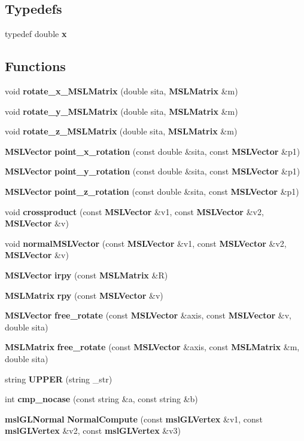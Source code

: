 \subsection*{Typedefs}
\begin{CompactItemize}
\item 
typedef double {\bf x}
\end{CompactItemize}
\subsection*{Functions}
\begin{CompactItemize}
\item 
void {\bf rotate\_\-x\_\-MSLMatrix} (double sita, {\bf MSLMatrix} \&m)
\item 
void {\bf rotate\_\-y\_\-MSLMatrix} (double sita, {\bf MSLMatrix} \&m)
\item 
void {\bf rotate\_\-z\_\-MSLMatrix} (double sita, {\bf MSLMatrix} \&m)
\item 
{\bf MSLVector} {\bf point\_\-x\_\-rotation} (const double \&sita, const {\bf MSLVector} \&p1)
\item 
{\bf MSLVector} {\bf point\_\-y\_\-rotation} (const double \&sita, const {\bf MSLVector} \&p1)
\item 
{\bf MSLVector} {\bf point\_\-z\_\-rotation} (const double \&sita, const {\bf MSLVector} \&p1)
\item 
void {\bf crossproduct} (const {\bf MSLVector} \&v1, const {\bf MSLVector} \&v2, {\bf MSLVector} \&v)
\item 
void {\bf normal\-MSLVector} (const {\bf MSLVector} \&v1, const {\bf MSLVector} \&v2, {\bf MSLVector} \&v)
\item 
{\bf MSLVector} {\bf irpy} (const {\bf MSLMatrix} \&R)
\item 
{\bf MSLMatrix} {\bf rpy} (const {\bf MSLVector} \&v)
\item 
{\bf MSLVector} {\bf free\_\-rotate} (const {\bf MSLVector} \&axis, const {\bf MSLVector} \&v, double sita)
\item 
{\bf MSLMatrix} {\bf free\_\-rotate} (const {\bf MSLVector} \&axis, const {\bf MSLMatrix} \&m, double sita)
\item 
string {\bf UPPER} (string \_\-str)
\item 
int {\bf cmp\_\-nocase} (const string \&a, const string \&b)
\item 
{\bf msl\-GLNormal} {\bf Normal\-Compute} (const {\bf msl\-GLVertex} \&v1, const {\bf msl\-GLVertex} \&v2, const {\bf msl\-GLVertex} \&v3)
\end{CompactItemize}
